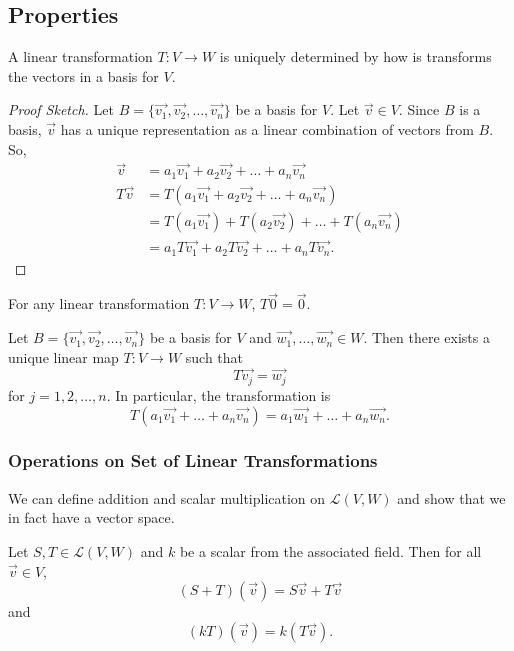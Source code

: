 \subsection{Properties}

\begin{theorem}
	A linear transformation $T: V \to W$ is uniquely determined by how is transforms the vectors in a basis for $V$.
\end{theorem}
\begin{proof}[Proof Sketch]
	Let $B = \{\vec{v_1}, \vec{v_2}, \dots, \vec{v_n}\}$ be a basis for $V$.
	Let $\vec{v} \in V$.
	Since $B$ is a basis, $\vec{v}$ has a unique representation as a linear combination of vectors from $B$.
	So,
	\begin{align*}
		\vec{v} &= a_1\vec{v_1} + a_2\vec{v_2} + \dots + a_n\vec{v_n} \\
		T\vec{v} &= T(a_1\vec{v_1} + a_2\vec{v_2} + \dots + a_n\vec{v_n}) \\
			&= T(a_1\vec{v_1}) + T(a_2\vec{v_2}) + \dots + T(a_n\vec{v_n}) \\
			&= a_1T\vec{v_1} + a_2T\vec{v_2} + \dots + a_nT\vec{v_n}.
	\end{align*}
\end{proof}

\begin{corollary}
	For any linear transformation $T: V \to W$, $T\vec{0} = \vec{0}$.
\end{corollary}

\begin{theorem}
	Let $B = \{\vec{v_1}, \vec{v_2}, \dots, \vec{v_n}\}$ be a basis for $V$ and $\vec{w_1},\dots,\vec{w_n} \in W$.
	Then there exists a unique linear map $T: V \to W$ such that
	\begin{equation*}
		T\vec{v_j} = \vec{w_j}
	\end{equation*}
	for $j = 1, 2, \dots, n$.
	In particular, the transformation is
	\begin{equation*}
		T(a_1\vec{v_1} + \dots + a_n\vec{v_n}) = a_1\vec{w_1} + \dots + a_n\vec{w_n}.
	\end{equation*}
\end{theorem}

\subsubsection{Operations on Set of Linear Transformations}

We can define addition and scalar multiplication on $\mathcal{L}(V,W)$ and show that we in fact have a vector space.
\begin{definition}
	Let $S, T \in \mathcal{L}(V,W)$ and $k$ be a scalar from the associated field.
	Then for all $\vec{v} \in V$,
	\begin{equation*}
		(S+T)(\vec{v}) = S\vec{v} + T\vec{v}
	\end{equation*}
	and
	\begin{equation*}
		(kT)(\vec{v}) = k(T\vec{v}).
	\end{equation*}
\end{definition}

